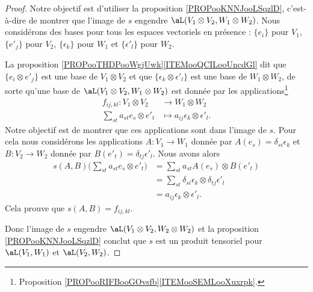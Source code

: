 \begin{proof}
	Notre objectif est d'utiliser la proposition \ref{PROPooKNNJooLSqzlD}, c'est-à-dire de montrer que l'image de \( s\) engendre \( \aL(V_1\otimes V_2,W_1\otimes W_2)\). Nous considérons des bases pour tous les espaces vectoriels en présence : \( \{ e_i \}\) pour \( V_1\), \( \{ e'_j \}\) pour \( V_2\), \( \{ \epsilon_k \}\) pour \( W_1\) et \( \{ \epsilon'_l \}\) pour \( W_2\).

	La proposition \ref{PROPooTHDPooWgjUwk}\ref{ITEMooQCILooUncdGl} dit que \( \{ e_i\otimes e'_j \}\) est une base de \( V_1\otimes V_2\) et que \( \{ \epsilon_k\otimes \epsilon'_l \}\) est une base de \( W_1\otimes W_2\), de sorte qu'une base de \( \aL(V_1\otimes V_2,W_1\otimes W_2)\) est donnée par les applications\footnote{Proposition \ref{PROPooRIFBooGOvsfb}\ref{ITEMooSEMLooXuxrpk}.}
	\begin{equation}
		\begin{aligned}
			f_{ij,kl}\colon V_1\otimes V_2 & \to W_1\otimes W_2                             \\
			\sum_{st}a_{st}e_s\otimes e'_t & \mapsto a_{ij}  \epsilon_k\otimes \epsilon'_l.
		\end{aligned}
	\end{equation}
	Notre objectif est de montrer que ces applications sont dans l'image de \( s\). Pour cela nous considérons les applications \(A \colon V_1\to W_1  \) donnée par \( A(e_s)=\delta_{si}\epsilon_k\) et \(B \colon V_2\to W_2  \) donnée par \( B(e'_t)=\delta_{tj}\epsilon'_l\). Nous avons alors
	\begin{subequations}
		\begin{align}
			s(A,B)\big( \sum_{st}a_{st}e_s\otimes e'_t \big) & =\sum_{st}a_{st}A(e_s)\otimes B(e'_t)                         \\
			                                                 & =\sum_{st}\delta_{si}\epsilon_k\otimes \delta_{tj}\epsilon'_l \\
			                                                 & =a_{ij} \epsilon_k\otimes \epsilon'_l.
		\end{align}
	\end{subequations}
	Cela prouve que \( s(A,B)=f_{ij,kl}\).

	Donc l'image de \( s\) engendre \( \aL(V_1\otimes V_2,W_2\otimes W_2)\) et la proposition \ref{PROPooKNNJooLSqzlD} conclut que \( s\) est un produit tensoriel pour \(\aL(V_1,W_1)\) et \( \aL(V_2,W_2)\).
\end{proof}


